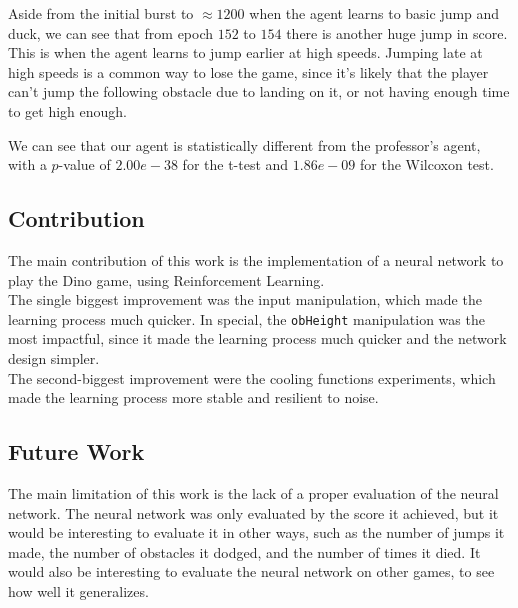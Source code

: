\documentclass[review]{elsarticle}
\begin{document}
Aside from the initial burst to $\approx 1200$ when the agent learns to basic jump and duck, we can see that from epoch $152$ to $154$ there is another huge jump in score. This is when the agent learns to jump earlier at high speeds. Jumping late at high speeds is a common way to lose the game, since it's likely that the player can't jump the following obstacle due to landing on it, or not having enough time to get high enough.

We can see that our agent is statistically different from the professor's agent, with a $p$-value of $2.00e-38$ for the t-test and $1.86e-09$ for the Wilcoxon test.

\subsection{Contribution}

The main contribution of this work is the implementation of a neural network to play the Dino game, using Reinforcement Learning. \\
The single biggest improvement was the input manipulation, which made the learning process much quicker. In special, the \texttt{obHeight} manipulation was the most impactful, since it made the learning process much quicker and the network design simpler. \\
The second-biggest improvement were the cooling functions experiments, which made the learning process more stable and resilient to noise.

\subsection{Future Work}

The main limitation of this work is the lack of a proper evaluation of the neural network. The neural network was only evaluated by the score it achieved, but it would be interesting to evaluate it in other ways, such as the number of jumps it made, the number of obstacles it dodged, and the number of times it died. It would also be interesting to evaluate the neural network on other games, to see how well it generalizes.

% 
\end{document}
